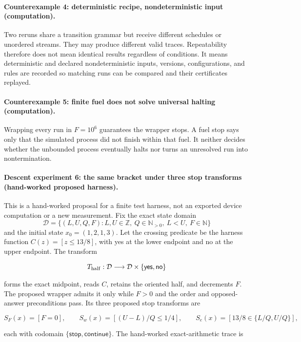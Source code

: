 \paragraph{Counterexample 4: deterministic recipe, nondeterministic input (computation).}
Two reruns share a transition grammar but receive different schedules or unordered streams.  They may produce
different valid traces.  Repeatability therefore does not mean identical results regardless of conditions.  It means
deterministic and declared nondeterministic inputs, versions, configurations, and rules are recorded so matching runs
can be compared and their certificates replayed.

\paragraph{Counterexample 5: finite fuel does not solve universal halting (computation).}
Wrapping every run in \(F=10^6\) guarantees the wrapper stops.  A fuel stop says only that the simulated process did
not finish within that fuel.  It neither decides whether the unbounded process eventually halts nor turns an
unresolved run into nontermination.

\paragraph{Descent experiment 6: the same bracket under three stop transforms (hand-worked proposed harness).}
This is a hand-worked proposal for a finite test harness, not an exported device computation or a new measurement.
Fix the exact state domain
\[
 \mathcal D=\{(L,U,Q,F):L,U\in\mathbb Z,\ Q\in\mathbb N_{>0},\ L<U,\ F\in\mathbb N\}
\]
and the initial state \(x_0=(1,2,1,3)\).  Let the crossing predicate be the harness function
\(C(z)=[z\leq13/8]\), with yes at the lower endpoint and no at the upper endpoint.  The transform

\[
 T_{\rm half}:\mathcal D\longrightarrow
 \mathcal D\times\{\mathsf{yes},\mathsf{no}\}
\]

forms the exact midpoint, reads \(C\), retains the oriented half, and decrements \(F\).  The proposed wrapper admits
it only while \(F>0\) and the order and opposed-answer preconditions pass.  Its three proposed stop transforms are

\[
 S_F(x)=[F=0],\qquad
 S_w(x)=[(U-L)/Q\leq1/4],\qquad
 S_e(x)=[13/8\in\{L/Q,U/Q\}],
\]

each with codomain \(\{\mathsf{stop},\mathsf{continue}\}\).  The hand-worked exact-arithmetic trace is

